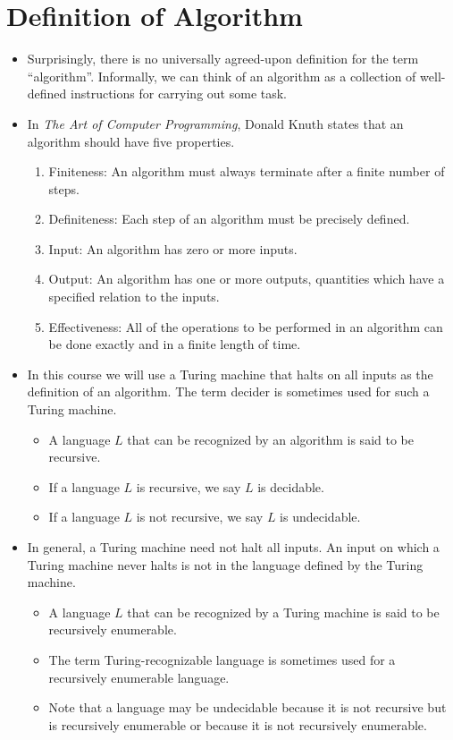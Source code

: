 \documentclass[]{article}
\begin{document}
\section{Definition of Algorithm}
  \begin{itemize}
    \item Surprisingly, there is no universally agreed-upon definition for the
    term ``algorithm''. Informally, we can think of an algorithm as a collection
    of well-defined instructions for carrying out some task.
    \item In \emph{The Art of Computer Programming}, Donald Knuth states that an
    algorithm should have five properties.
      \begin{enumerate}
        \item Finiteness: An algorithm must always terminate after a finite
        number of steps.
        \item Definiteness: Each step of an algorithm must be precisely defined.
        \item Input: An algorithm has zero or more inputs.
        \item Output: An algorithm has one or more outputs, quantities which
        have a specified relation to the inputs.
        \item Effectiveness: All of the operations to be performed in an
        algorithm can be done exactly and in a finite length of time.
      \end{enumerate}
    \item In this course we will use a Turing machine that halts on all inputs
    as the definition of an algorithm. The term decider is sometimes used for 
    such a Turing machine.
      \begin{itemize}
        \item A language $L$ that can be recognized by an algorithm is said to
        be recursive.
        \item If a language $L$ is recursive, we say $L$ is decidable.
        \item If a language $L$ is not recursive, we say $L$ is undecidable.
      \end{itemize}
    \item In general, a Turing machine need not halt all inputs. An input on
    which a Turing machine never halts is not in the language defined by the 
    Turing machine.
      \begin{itemize}
        \item A language $L$ that can be recognized by a Turing machine is said
        to be recursively enumerable.
        \item The term Turing-recognizable language is sometimes used for a
        recursively enumerable language.
        \item Note that a language may be undecidable because it is not
        recursive but is recursively enumerable or because it is not 
        recursively enumerable.
      \end{itemize}
  \end{itemize}
\end{document}
